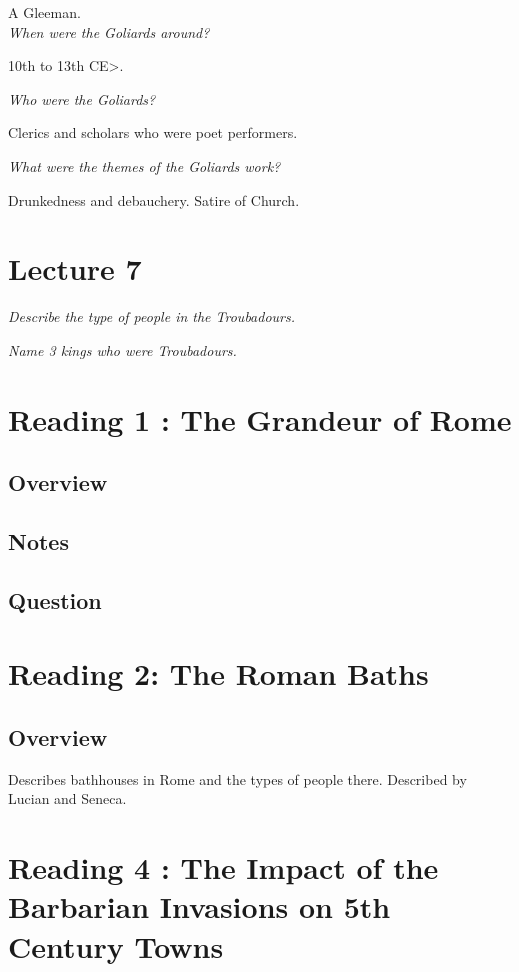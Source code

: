 \documentclass[12pt]{article}
\begin{document}
A Gleeman.\\


\textit{When were the Goliards around?}

10th to 13th CE>.

\textit{Who were the Goliards?}

Clerics and scholars who were poet performers.

\textit{What were the themes of the Goliards work?}

Drunkedness and debauchery. Satire of Church.\\

\section*{Lecture 7}

\textit{Describe the type of people in the Troubadours.}

\textit{Name 3 kings who were Troubadours.}

\section*{Reading 1 : The Grandeur of Rome}

\subsection*{Overview}

\subsection*{Notes}

\subsection*{Question}

\section*{Reading 2: The Roman Baths}

\subsection*{Overview}

Describes bathhouses in Rome and the types of people there. Described by Lucian and Seneca.

\section*{Reading 4 : The Impact of the Barbarian Invasions on 5th Century Towns}
\end{document}
